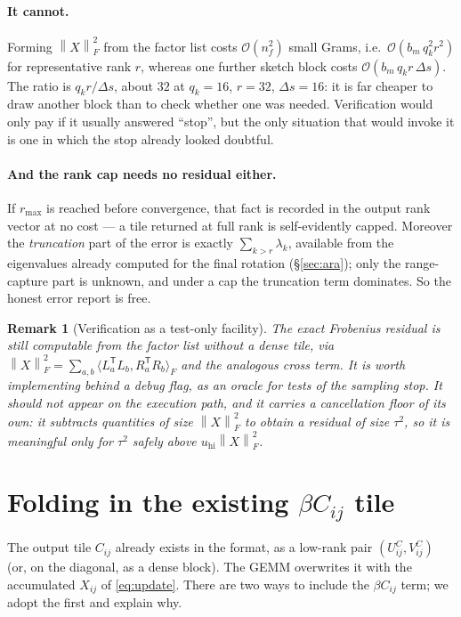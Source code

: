 \documentclass[11pt]{article}
\newtheorem{remark}{Remark}
\newcommand{\T}{\mathsf{T}}
\newcommand{\Fnorm}[1]{\left\|#1\right\|_F}
\begin{document}
\paragraph{It cannot.}
Forming $\Fnorm{X}^2$ from the factor list costs $\mathcal O(n_f^2)$ small
Grams, i.e.\ $\mathcal O(b_m\,q_k^2r^2)$ for representative rank $r$, whereas one
further sketch block costs $\mathcal O(b_m\,q_k r\,\Delta s)$. The ratio is
$q_k r/\Delta s$, about $32$ at $q_k=16$, $r=32$, $\Delta s=16$: it is far
cheaper to draw another block than to check whether one was needed. Verification
would only pay if it usually answered ``stop'', but the only situation that
would invoke it is one in which the stop already looked doubtful.

\paragraph{And the rank cap needs no residual either.}
If $r_{\max}$ is reached before convergence, that fact is recorded in the output
rank vector at no cost --- a tile returned at full rank is self-evidently
capped. Moreover the \emph{truncation} part of the error is exactly
$\sum_{k>r}\lambda_k$, available from the eigenvalues already computed for the
final rotation (\S\ref{sec:ara}); only the range-capture part is unknown, and
under a cap the truncation term dominates. So the honest error report is free.

\begin{remark}[Verification as a test-only facility]
\label{rem:verify}
The exact Frobenius residual is still computable from the factor list without a
dense tile, via $\Fnorm{X}^2=\sum_{a,b}\langle L_a^{\T}L_b,R_a^{\T}R_b\rangle_F$
and the analogous cross term. It is worth implementing behind a debug flag, as
an oracle for tests of the sampling stop. It should not appear on the execution
path, and it carries a cancellation floor of its own: it subtracts quantities of
size $\Fnorm{X}^2$ to obtain a residual of size $\tau^2$, so it is meaningful
only for $\tau^2$ safely above $u_{\mathrm{hi}}\Fnorm{X}^2$.
\end{remark}

\section{Folding in the existing \texorpdfstring{$\beta C_{ij}$}{beta C} tile}
\label{sec:beta}

The output tile $C_{ij}$ already exists in the format, as a low-rank pair
$(U^C_{ij},V^C_{ij})$ (or, on the diagonal, as a dense block). The GEMM
overwrites it with the accumulated $X_{ij}$ of \eqref{eq:update}. There are two
ways to include the $\beta C_{ij}$ term; we adopt the first and explain why.
\end{document}
